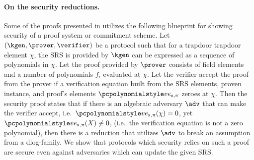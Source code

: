 \documentclass[runningheads,11pt]{llncs}
\begin{document}
\paragraph{On the security reductions.}
Some of the proofs presented in \cite{EPRINT:GabWilCio19,CCS:MBKM19} utilizes
the following blueprint for showing security of a proof system or commitment
scheme. Let $(\kgen, \prover, \verifier)$ be a protocol such that for a trapdoor
trapdoor element $\chi$, the SRS is provided by $\kgen$ can be expressed as a
sequence of polynomials in $\chi$. Let the proof provided by $\prover$ consists
of field elements and a number of polynomials $f_i$ evaluated at $\chi$. Let the
verifier accept the proof from the prover if a verification equation built from
the SRS elements, proven instance, and proof's elements $\vereq_{\inp, \zkproof}$ zeroes at
$\chi$. Then the security proof states that if there is an algebraic adversary
$\adv$ that can make the verifier accept, i.e.~$\vereq_{\inp, \zkproof}(\chi) = 0$, yet
$\vereq_{\inp, \zkproof}(X) \not\equiv 0$, (i.e.~the verification equation is not a zero
polynomial), then there is a reduction that utilizes $\adv$ to break an
assumption from a dlog-family. We show that protocols which security relies on
such a proof are secure even against adversaries which can update the given SRS.
\end{document}
